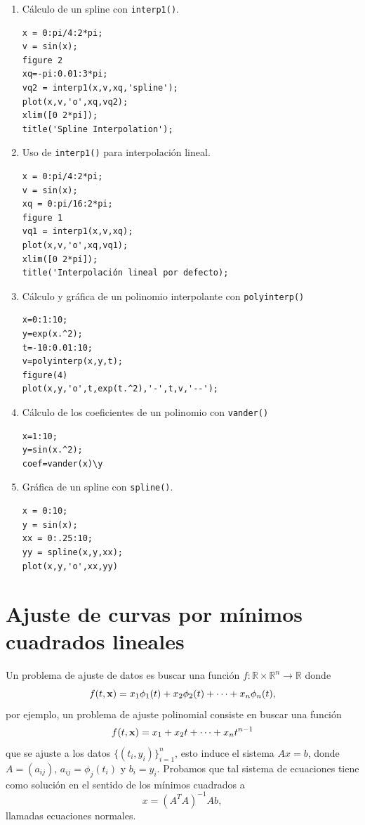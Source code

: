 \documentclass[11pt]{article}
\begin{document}
\begin{multicols}{2}
\begin{enumerate}
\item C\'alculo de un spline con \texttt{interp1()}.
\begin{verbatim}
x = 0:pi/4:2*pi;
v = sin(x);
figure 2
xq=-pi:0.01:3*pi;
vq2 = interp1(x,v,xq,'spline');
plot(x,v,'o',xq,vq2);
xlim([0 2*pi]);
title('Spline Interpolation');
\end{verbatim}

\item Uso de \texttt{interp1()} para interpolaci\'on lineal.
\begin{verbatim}
x = 0:pi/4:2*pi;
v = sin(x);
xq = 0:pi/16:2*pi;
figure 1 
vq1 = interp1(x,v,xq);
plot(x,v,'o',xq,vq1);
xlim([0 2*pi]);
title('Interpolación lineal por defecto);
\end{verbatim}

\item C\'alculo y gr\'afica de un polinomio interpolante con \texttt{polyinterp()}
\begin{verbatim}
x=0:1:10;
y=exp(x.^2);
t=-10:0.01:10;
v=polyinterp(x,y,t);
figure(4)
plot(x,y,'o',t,exp(t.^2),'-',t,v,'--');
\end{verbatim}

\item C\'alculo de los coeficientes de un polinomio con \texttt{vander()}
\begin{verbatim}
x=1:10;
y=sin(x.^2);
coef=vander(x)\y
\end{verbatim}

\item Gr\'afica de un spline con \texttt{spline()}.
\begin{verbatim}
x = 0:10;
y = sin(x);
xx = 0:.25:10;
yy = spline(x,y,xx);
plot(x,y,'o',xx,yy)
\end{verbatim}
\end{enumerate}
\end{multicols}



\section{Ajuste de curvas por m\'inimos cuadrados lineales}

Un problema de ajuste de datos es buscar una funci\'on $f:\mathbb{R}\times\mathbb{R}^n \rightarrow \mathbb{R}$ donde 
$$
f(t, {\bf x})=x_1\phi_1(t)+x_2\phi_2(t)+\cdots+x_n\phi_n(t),
$$
por ejemplo, un problema de ajuste polinomial consiste en buscar una funci\'on
$$
f(t,{\bf x}) =x_1+x_2t+ \cdots + x_n t^{n-1} 
$$
que se ajuste a los datos $\{(t_i,y_i)\}_{i=1}^n$, esto induce el sistema  $Ax=b$, donde $A=(a_{ij})$, $a_{ij}=\phi_j(t_i)$  y $b_i=y_i$. Probamos que tal sistema de ecuaciones tiene como soluci\'on en el sentido de los m\'inimos cuadrados a
$$
x=(A^TA)^{-1}Ab,
$$
llamadas ecuaciones normales.
\end{document}
